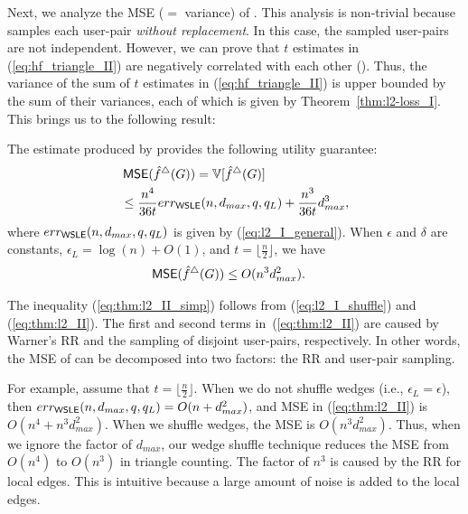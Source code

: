 Next, we analyze the MSE ($=$ variance) of \AlgWSTri{}.
This analysis is 
non-trivial 
because \AlgWSTri{} samples each user-pair \textit{without replacement}.
In this case, the sampled user-pairs are not independent.
However, we can prove that
$t$ estimates in (\ref{eq:hf_triangle_II}) are negatively correlated with each other ().
Thus, the variance of the sum of $t$ estimates
in (\ref{eq:hf_triangle_II}) is upper bounded by the sum of their variances, each of which is given by Theorem~\ref{thm:l2-loss_I}.
This brings us to the following result:

\begin{theorem}
\label{thm:l2-loss_II}
The estimate produced by \AlgWSTri{} provides the following utility guarantee:
\begin{align}
& \operatorname{\textsf{MSE}}(\hat{f}^\triangle(G)) = \mathbb{V}[\hat{f}^\triangle(G)] \nonumber\\
  &\leq
  \frac{n^4}{36t}err_{\textsf{WSLE}{}}(n,d_{max},q,q_L) +
  \frac{n^3}{36t}d_{max}^3, \label{eq:thm:l2_II}
\end{align}
where $err_{\textsf{WSLE}{}}(n,d_{max},q,q_L)$ is given by (\ref{eq:l2_I_general}).
  When $\epsilon$ and $\delta$ are constants,  $\epsilon_L = \log(n) + O(1)$, and
  $t = \lfloor\frac{n}{2}\rfloor$, we have
\begin{align}
\operatorname{\textsf{MSE}}(\hat{f}^\triangle(G))
  &\leq
  O(n^3d_{max}^2). \label{eq:thm:l2_II_simp}
\end{align}
\end{theorem}

The inequality (\ref{eq:thm:l2_II_simp}) follows from (\ref{eq:l2_I_shuffle}) and (\ref{eq:thm:l2_II}). 
The first and second terms in~(\ref{eq:thm:l2_II}) are caused by
Warner's RR
and the sampling of disjoint user-pairs, respectively.
In other words, the MSE of \AlgWSTri{} can be decomposed into two factors: the RR
and user-pair sampling.

For example, assume that $t = \lfloor \frac{n}{2} \rfloor$.
When we do not shuffle wedges (i.e., $\epsilon_L = \epsilon$), then
$err_{\textsf{WSLE}{}}(n,d_{max},q,q_L) = O(n + d_{max}^2)$, and
MSE in (\ref{eq:thm:l2_II}) is $O(n^4 + n^3 d_{max}^2)$.
When we shuffle wedges, the MSE is $O(n^3 d_{max}^2)$.
Thus, when we ignore the factor of $d_{max}$, our wedge shuffle technique reduces the MSE from $O(n^4)$ to $O(n^3)$ in triangle counting.
The factor of $n^3$ is caused by the RR for local edges.
This is intuitive because a large amount of noise is added to the local edges.

